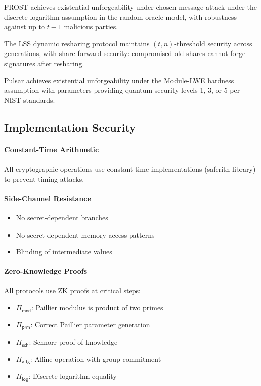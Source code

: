 \begin{theorem}
FROST achieves existential unforgeability under chosen-message attack under the discrete logarithm assumption in the random oracle model, with robustness against up to $t-1$ malicious parties.
\end{theorem}

\begin{theorem}
The LSS dynamic resharing protocol maintains $(t,n)$-threshold security across generations, with share forward security: compromised old shares cannot forge signatures after resharing.
\end{theorem}

\begin{theorem}
Pulsar achieves existential unforgeability under the Module-LWE hardness assumption with parameters providing quantum security levels 1, 3, or 5 per NIST standards.
\end{theorem}

\subsection{Implementation Security}

\paragraph{Constant-Time Arithmetic} All cryptographic operations use constant-time implementations (saferith library) to prevent timing attacks.

\paragraph{Side-Channel Resistance}
\begin{itemize}
\item No secret-dependent branches
\item No secret-dependent memory access patterns
\item Blinding of intermediate values
\end{itemize}

\paragraph{Zero-Knowledge Proofs} All protocols use ZK proofs at critical steps:
\begin{itemize}
\item $\Pi_{\textsf{mod}}$: Paillier modulus is product of two primes
\item $\Pi_{\textsf{prm}}$: Correct Paillier parameter generation
\item $\Pi_{\textsf{sch}}$: Schnorr proof of knowledge
\item $\Pi_{\textsf{affg}}$: Affine operation with group commitment
\item $\Pi_{\textsf{log}}$: Discrete logarithm equality
\end{itemize}

